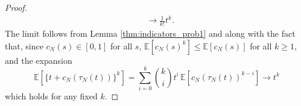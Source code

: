 \documentclass{article}
\newcommand{\E}{\mathbb{E}}
\newcommand{\1}[1]{\mathbbm{1}_{#1}}
\begin{document}
\begin{proof}
\begin{align}
&\longrightarrow \frac{1}{k!} t^k . \label{eq:19a}
\end{align}
The limit follows from Lemma \ref{thm:indicators_prob1} and \citet[Equations (3.3)--(3.4)]{brown2021} along with the fact that, since $c_N(s) \in [0,1]$ for all $s$, $\E[c_N(s)^k] \leq \E[c_N(s)]$ for all $k\geq 1$, and the expansion
\begin{equation}\label{eq:11}
\E\left[ \{t+ c_N(\tau_N(t)) \}^k \right]
=\sum_{i=0}^k \binom{k}{i} t^i \,
\E\left[ c_N(\tau_N(t))^{k-i} \right]
\longrightarrow t^k 
\end{equation}
which holds for any fixed $k$.


\end{proof}
\end{document}
